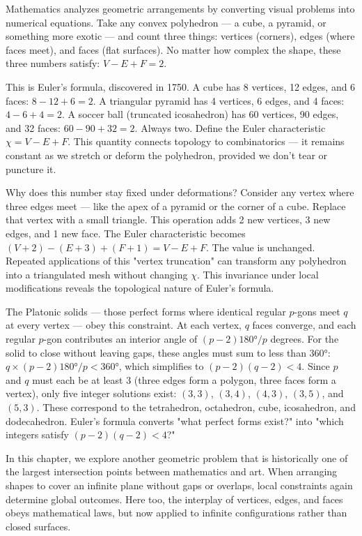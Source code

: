 Mathematics analyzes geometric arrangements by converting visual problems into numerical equations. Take any convex polyhedron — a cube, a pyramid, or something more exotic — and count three things: vertices (corners), edges (where faces meet), and faces (flat surfaces). No matter how complex the shape, these three numbers satisfy: $V - E + F = 2$.

This is Euler's formula, discovered in 1750. A cube has 8 vertices, 12 edges, and 6 faces: $8 - 12 + 6 = 2$. A triangular pyramid has 4 vertices, 6 edges, and 4 faces: $4 - 6 + 4 = 2$. A soccer ball (truncated icosahedron) has 60 vertices, 90 edges, and 32 faces: $60 - 90 + 32 = 2$. Always two. Define the Euler characteristic $\chi = V - E + F$. This quantity connects topology to combinatorics — it remains constant as we stretch or deform the polyhedron, provided we don't tear or puncture it.

Why does this number stay fixed under deformations? Consider any vertex where three edges meet — like the apex of a pyramid or the corner of a cube. Replace that vertex with a small triangle. This operation adds 2 new vertices, 3 new edges, and 1 new face. The Euler characteristic becomes $(V + 2) - (E + 3) + (F + 1) = V - E + F$. The value is unchanged. Repeated applications of this "vertex truncation" can transform any polyhedron into a triangulated mesh without changing $\chi$. This invariance under local modifications reveals the topological nature of Euler's formula.

The Platonic solids — those perfect forms where identical regular $p$-gons meet $q$ at every vertex — obey this constraint. At each vertex, $q$ faces converge, and each regular $p$-gon contributes an interior angle of $(p-2)180°/p$ degrees. For the solid to close without leaving gaps, these angles must sum to less than $360°$: $q \times (p-2)180°/p < 360°$, which simplifies to $(p-2)(q-2) < 4$. Since $p$ and $q$ must each be at least 3 (three edges form a polygon, three faces form a vertex), only five integer solutions exist: $(3,3)$, $(3,4)$, $(4,3)$, $(3,5)$, and $(5,3)$. These correspond to the tetrahedron, octahedron, cube, icosahedron, and dodecahedron. Euler's formula converts "what perfect forms exist?" into "which integers satisfy $(p-2)(q-2) < 4$?"

In this chapter, we explore another geometric problem that is historically one of the largest intersection points between mathematics and art. When arranging shapes to cover an infinite plane without gaps or overlaps, local constraints again determine global outcomes. Here too, the interplay of vertices, edges, and faces obeys mathematical laws, but now applied to infinite configurations rather than closed surfaces.

